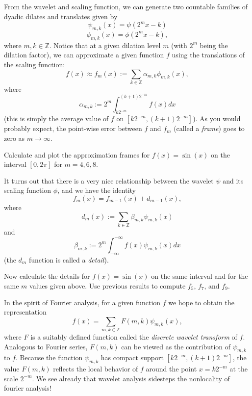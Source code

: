 From the wavelet and scaling function, we can generate two countable families 
of dyadic dilates and translates given by 
\begin{equation*}
\psi_{m,k}(x) = \psi(2^mx - k)
\end{equation*}
\begin{equation*}
\phi_{m,k}(x) = \phi(2^mx - k),
\end{equation*}
where $m,k \in \mathbb{Z}$. Notice that at a given dilation level $m$ (with $2^m$ 
being the dilation factor), we can approximate a given function $f$ using the 
translations of the scaling function:
\begin{equation*}
f(x) \approx f_m(x) := \displaystyle\sum_{k \in \mathbb{Z}}\alpha_{m,k}\phi_{m,k}(x),
\end{equation*}
where 
\begin{equation*}
\alpha_{m,k} := 2^m \displaystyle \int_{k2^{-m}}^{(k+1)2^{-m}}f(x) dx    
\end{equation*}
(this is simply the average value of $f$ on $[k2^{-m},(k+1)2^{-m}]$). As you would probably
expect, the point-wise error between $f$ and $f_m$ (called a \emph{frame}) goes to zero as $m \to \infty$. 
\begin{problem}
Calculate and plot the approximation frames for $f(x) = \sin(x)$ on the interval $[0,2\pi]$ for $m = 
4, 6, 8$. 
\end{problem}
It turns out that there is a very nice relationship between the wavelet $\psi$ and its scaling 
function $\phi$, and we have the identity
\begin{equation*}
f_m(x) = f_{m-1}(x) + d_{m-1}(x),
\end{equation*}
where 
\begin{equation*}
d_m(x) := \displaystyle\sum_{k \in \mathbb{Z}}\beta_{m,k}\psi_{m,k}(x)
\end{equation*}
and
\begin{equation*} 
\beta_{m,k} := 2^m \displaystyle \int_{-\infty}^{-\infty}f(x) \psi_{m,k}(x) dx
\end{equation*}
(the $d_m$ function is called a \emph{detail}).
\begin{problem}
Now calculate the details for $f(x) = \sin(x)$ on the same interval and for the same $m$ values given
above. Use previous results to compute $f_5$, $f_7$, and $f_9$.
\end{problem}  

In the spirit of Fourier analysis, for a given function $f$
we hope to obtain the representation 
\begin{equation*}
f(x) = \displaystyle\sum_{m,k \in \mathbb{Z}} F(m,k)\psi_{m,k}(x),
\end{equation*}
where $F$ is a suitably defined function called the \emph{discrete wavelet transform} of $f$.
Analogous to Fourier series, $F(m,k)$ can be viewed as the contribution of $\psi_{m,k}$
to $f$. Because the function $\psi_{m,k}$ has compact support $[k2^{-m},(k+1)2^{-m}]$, 
the value $F(m,k)$ reflects the local behavior of $f$ around the point $x = k2^{-m}$ at the scale
$2^{-m}$. We see already that wavelet analysis sidesteps the nonlocality of fourier analysis!

